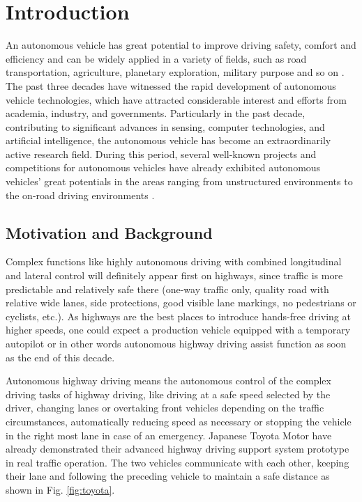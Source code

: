 \chapter{Introduction}


An autonomous vehicle has great potential to improve driving safety, comfort and efficiency and can be widely applied in a variety of fields, such as road transportation, agriculture, planetary exploration, military purpose and so on \cite {WANG2015727}. The past three decades have witnessed the rapid development of autonomous vehicle technologies, which have attracted considerable interest and efforts from academia, industry, and governments. Particularly in the past decade, contributing to significant advances in sensing, computer technologies, and artificial intelligence, the autonomous vehicle has become an extraordinarily active research field. During this period, several well-known projects and competitions for autonomous vehicles have already exhibited autonomous vehicles' great potentials in the areas ranging from unstructured environments to the on-road driving environments \cite{AutonomousStructured} \cite{DrivingUrban2008}.

\section{Motivation and Background}


Complex functions like highly autonomous driving with combined longitudinal and lateral control will definitely appear first on highways, since traffic is more predictable and relatively safe there (one-way traffic only, quality road with relative wide lanes, side protections, good visible lane markings, no pedestrians or cyclists, etc.). As highways are the best places to introduce hands-free driving at higher speeds, one could expect a production vehicle equipped with a temporary autopilot or in other words autonomous highway driving assist function as soon as the end of this decade. 

Autonomous highway driving means the autonomous control of the complex driving tasks of highway driving, like driving at a safe speed selected by the driver, changing lanes or overtaking front vehicles depending on the traffic circumstances, automatically reducing speed as necessary or stopping the vehicle in the right most lane in case of an emergency. Japanese Toyota Motor have already demonstrated their advanced highway driving support system prototype in real traffic operation. The two vehicles  communicate with each other, keeping their lane and following the preceding vehicle to maintain a safe distance \cite{Nissan2013} as shown in Fig. \ref{fig:toyota}.

